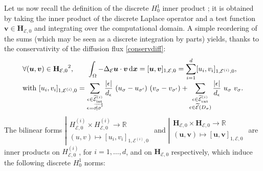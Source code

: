 \documentclass{amsart}
\numberwithin{equation}{section}
\begin{document}
Let us now recall the definition of the discrete $H^1_0$ inner product \cite{eymard2000finite}; it is obtained by taking the inner product of the discrete Laplace operator and a test function ${{\boldsymbol v}}\in{{\mathbf{H}_{{{\mathcal E}},0}}}$ and integrating over the computational domain.
A simple reordering of the sums (which may be seen as a discrete integration by parts) yields, thanks to the conservativity of the diffusion flux \eqref{conservdiff}:
\begin{equation}
  \label{ps}
  \begin{array}{l}
    \displaystyle \forall ({{\boldsymbol u}}, {{\boldsymbol v}}) \in {{\mathbf{H}_{{{\mathcal E}},0}}}^2, \qquad \int_\Omega -\Delta_{{\mathcal E}} {{\boldsymbol u}} \cdot {{\boldsymbol v}} {\, {\rm d}{{\boldsymbol x}}}= [{{\boldsymbol u}},{{\boldsymbol v}}]_{1,{{\mathcal E}},0}=\sum_{i=1}^d [{u_i},{v_i}]_{1,{\mathcal {E}^{(i)}},0}, \\
    [2ex]\mbox{with }[{u_i},{v_i}]_{1,{\mathcal {E}^{(i)}},0} = \displaystyle\sum_{\substack{{\epsilon} \in {{{\widetilde {{\mathcal E}}}^{(i)}_{{\rm int}}}}\\ {\epsilon}=\overrightarrow{{{\sigma}}\!\vert{{\sigma}}'}}} \frac{|{\epsilon}|}{d_{\epsilon}}\ (u_{{\sigma}}-u_{{{\sigma}}'})\ (v_{{\sigma}}-v_{{{\sigma}}'})+ \sum_{\substack{{\epsilon} \in {{{\widetilde {{\mathcal E}}}^{(i)}_{{\rm ext}}}}\\ {\epsilon} \in {\widetilde {{\mathcal E}}}(D_{{\sigma}})}} \frac{|{\epsilon}|}{d_{\epsilon}}\ u_{{\sigma}}\ v_{{\sigma}}.
  \end{array}
\end{equation}
The bilinear forms $\left|\begin{array}{l}
                     {H_{{{\mathcal E}},0}^{(i)}} \times {H_{{{\mathcal E}},0}^{(i)}} \to {\mathbb{R}}\\
                      [1ex] (u,v) \mapsto  [{u_i},{v_i}]_{1,{\mathcal {E}^{(i)}},0}
                    \end{array}\right.
                   $
                   and
                   $\left|\begin{array}{l}
                     {{\mathbf{H}_{{{\mathcal E}},0}}} \times {{\mathbf{H}_{{{\mathcal E}},0}}} \to {\mathbb{R}}\\
                      [1ex] ({{\boldsymbol u}},{{\boldsymbol v}}) \mapsto  [{{\boldsymbol u}},{{\boldsymbol v}}]_{1,{{\mathcal E}},0}
                    \end{array}\right.
                    $
are inner products on ${H_{{{\mathcal E}},0}^{(i)}}$, for $i = 1, \ldots, d$, and on ${{\mathbf{H}_{{{\mathcal E}},0}}}$ respectively, which induce the following discrete $H^1_0$ norms:
\end{document}

